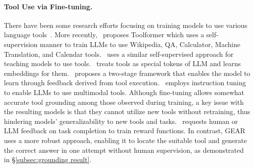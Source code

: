 \documentclass[11pt]{article}
\newcommand{\name}{{\fontfamily{cmss}\selectfont GEAR}}
\begin{document}
 
\paragraph{Tool Use via Fine-tuning.} There have been some research efforts focusing on training models to use various language tools~\citep{thoppilan2022lamda, komeili-etal-2022-internet, shuster2022blenderbot, khot2021text, khot2022learning}.
More recently,~\citet{schick2023toolformer} proposes Toolformer which uses a self-supervision manner to train LLMs to use Wikipedia, QA, Calculator, Machine Translation, and Calendar tools.~\citet{parisi2022talm} uses a similar self-supervised approach for teaching models to use tools.~\citet{hao2023toolkengpt} treats tools as special tokens of LLM and learns embeddings for them.~\citet{qiao2023making} proposes a two-stage framework that enables the model to learn through feedback derived from tool execution.~\citet{yang2023gpt4tools} employs instruction tuning to enable LLMs to use multimodal tools. 
Although fine-tuning allows somewhat accurate tool grounding among those observed during training, a key issue with the resulting models is that they cannot utilize new tools without retraining, thus hindering models' generalizability to new tools and tasks.~\citet{li2023api} requests human or LLM feedback on task completion to train reward functions. In contrast, \name{} uses a more robust approach, enabling it to locate the suitable tool and generate the correct answer in one attempt without human supervision, as demonstrated in \S\ref{subsec:grounding result}.
\end{document}
